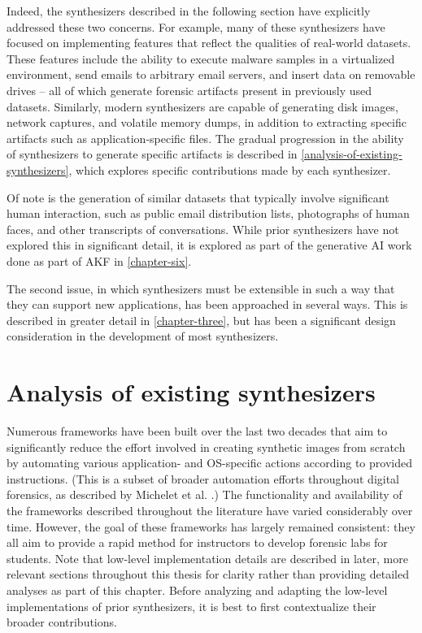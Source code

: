 \documentclass[letterpaper,12pt]{report}
\begin{document}
Indeed, the synthesizers described in the following section have
explicitly addressed these two concerns. For example, many of these
synthesizers have focused on implementing features that reflect the
qualities of real-world datasets. These features include the ability to
execute malware samples in a virtualized environment, send emails to
arbitrary email servers, and insert data on removable drives -- all of
which generate forensic artifacts present in previously used datasets.
Similarly, modern synthesizers are capable of generating disk images,
network captures, and volatile memory dumps, in addition to extracting
specific artifacts such as application-specific files. The gradual
progression in the ability of synthesizers to generate specific
artifacts is described in \autoref{analysis-of-existing-synthesizers}, which explores specific
contributions made by each synthesizer.

Of note is the generation of similar datasets that typically involve
significant human interaction, such as public email distribution lists,
photographs of human faces, and other transcripts of conversations.
While prior synthesizers have not explored this in significant detail,
it is explored as part of the generative AI work done as part of AKF in
\autoref{chapter-six}.

The second issue, in which synthesizers must be extensible in such a way
that they can support new applications, has been approached in several
ways. This is described in greater detail in \autoref{chapter-three}, but has been a significant design consideration in the
development of most synthesizers.

\section{Analysis of existing
synthesizers}\label{analysis-of-existing-synthesizers}

Numerous frameworks have been built over the last two decades that aim
to significantly reduce the effort involved in creating synthetic images
from scratch by automating various application- and OS-specific actions
according to provided instructions. (This is a subset of broader
automation efforts throughout digital forensics, as described by
Michelet et al. \cite{micheletAutomationDigitalForensics2023}.) The
functionality and availability of the frameworks described throughout
the literature have varied considerably over time. However, the goal of
these frameworks has largely remained consistent: they all aim to
provide a rapid method for instructors to develop forensic labs for
students. Note that low-level implementation details are described in
later, more relevant sections throughout this thesis for clarity rather
than providing detailed analyses as part of this chapter. Before
analyzing and adapting the low-level implementations of prior
synthesizers, it is best to first contextualize their broader
contributions.
\end{document}
